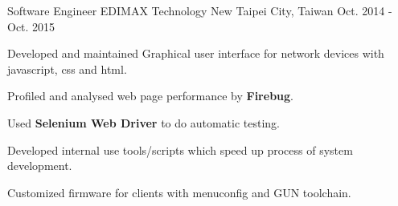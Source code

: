 

\begin{cventries}

  \cventry
    {Software Engineer  } %
    {EDIMAX Technology} %
    {New Taipei City, Taiwan} %
    {Oct. 2014 -  Oct. 2015} %
    {
      \begin{cvitems} %
      \item {Developed and maintained Graphical user interface for network devices with javascript, css and html.}
      \item {Profiled and analysed web page performance by \textbf{Firebug}.   }
      \item {Used \textbf{Selenium Web Driver} to do automatic testing.}
      \item {Developed internal use tools/scripts which speed up process of system development.}
      \item {Customized firmware for clients with menuconfig and GUN toolchain.}
      \end{cvitems}
    }

\end{cventries}
